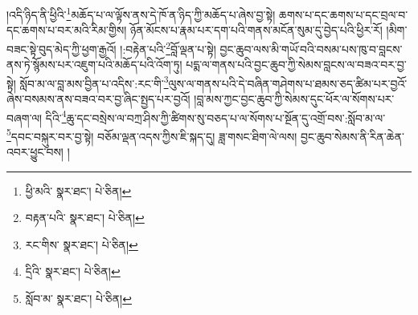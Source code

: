 །འདི་ཉིད་ནི་ཕྱིའི་\footnote{ཕྱི་མའི་  སྣར་ཐང་།  པེ་ཅིན། }མཆོད་པ་ལ་ལྟོས་ནས་དེ་ཁོ་ན་ཉིད་ཀྱི་མཆོད་པ་ཞེས་བྱ་སྟེ། ཆགས་པ་དང་ཆགས་པ་དང་བྲལ་བ་དང་ཆགས་པ་བར་མའི་རིམ་གྱིས། ཉོན་མོངས་པ་རྣམ་པར་དག་པའི་གནས་མངོན་སུམ་དུ་བྱེད་པའི་ཕྱིར་རོ། །མིག་བཟང་སྟེ་བུད་མེད་ཀྱི་ཕྱག་རྒྱའོ། །:བརྟེན་པའི་\footnote{བརྟན་པའི་  སྣར་ཐང་།  པེ་ཅིན། }བློ་ལྡན་པ་སྟེ། བྱང་ཆུབ་ལས་མི་གཡོ་བའི་བསམ་པས་ཁུ་བ་བླངས་ནས་ཏེ་སྙོམས་པར་འཇུག་པའི་མཆོད་པའི་འོག་ཏུ། པདྨ་ལ་གནས་པའི་བྱང་ཆུབ་ཀྱི་སེམས་བླངས་ལ་བཟའ་བར་བྱ་སྟེ། སློབ་མ་ལ་བླ་མས་བྱིན་པ་འདིས་:རང་གི་\footnote{རང་གིས་  སྣར་ཐང་།  པེ་ཅིན། }ལུས་ལ་གནས་པའི་དེ་བཞིན་གཤེགས་པ་ཐམས་ཅད་ཚིམ་པར་བྱའོ་ཞེས་བསམས་ནས་བཟའ་བར་བྱ་ཞིང་སྤྱད་པར་བྱའོ། །བླ་མས་ཀྱང་བྱང་ཆུབ་ཀྱི་སེམས་དུང་ཕོར་ལ་སོགས་པར་བཞག་ལ། དིའི་\footnote{དྲིའི་  སྣར་ཐང་།  པེ་ཅིན། }ཆུ་དང་བསྲེས་ལ་བཀྲ་ཤིས་ཀྱི་ཚིགས་སུ་བཅད་པ་ལ་སོགས་པ་སྔོན་དུ་འགྲོ་བས་:སློབ་མ་ལ་\footnote{སློབ་མ་  སྣར་ཐང་།  པེ་ཅིན། }དབང་བསྐུར་བར་བྱ་སྟེ། བཅོམ་ལྡན་འདས་ཀྱིས་ཇི་སྐད་དུ། ཟླ་གསང་ཐིག་ལེ་ལས། བྱང་ཆུབ་སེམས་ནི་རིན་ཆེན་འབར་ཕྱུང་བས། །
